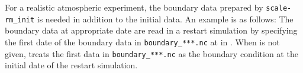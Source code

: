 For a realistic atmospheric experiment, the boundary data prepared by \verb|scale-rm_init| is needed in addition to the initial data. An example is as follows:
The boundary data at appropriate date are read in a restart simulation by specifying the first date of the boundary data in \verb|boundary_***.nc|  at  in . When  is not given, \scalerm treats the first data in \verb|boundary_***.nc|  as the boundary condition at the initial date of the restart simulation.

